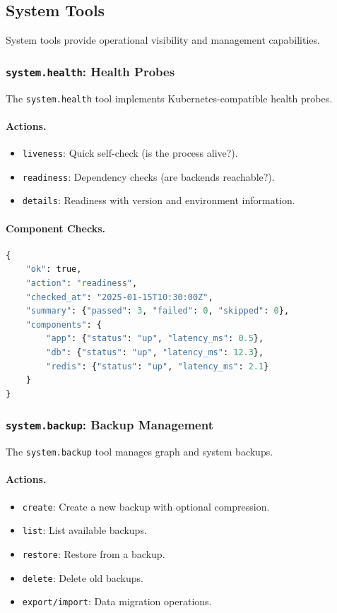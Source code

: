 \subsection{System Tools}
\label{subsec:system-tools}

System tools provide operational visibility and management capabilities.

\subsubsection{\texttt{system.health}: Health Probes}

The \texttt{system.health} tool implements Kubernetes-compatible health probes.

\paragraph{Actions.}
\begin{itemize}
    \item \texttt{liveness}: Quick self-check (is the process alive?).
    \item \texttt{readiness}: Dependency checks (are backends reachable?).
    \item \texttt{details}: Readiness with version and environment information.
\end{itemize}

\paragraph{Component Checks.}
\begin{lstlisting}[language=Python, caption={Health check response with component details}, label={lst:health-response}]
{
    "ok": true,
    "action": "readiness",
    "checked_at": "2025-01-15T10:30:00Z",
    "summary": {"passed": 3, "failed": 0, "skipped": 0},
    "components": {
        "app": {"status": "up", "latency_ms": 0.5},
        "db": {"status": "up", "latency_ms": 12.3},
        "redis": {"status": "up", "latency_ms": 2.1}
    }
}
\end{lstlisting}

\subsubsection{\texttt{system.backup}: Backup Management}

The \texttt{system.backup} tool manages graph and system backups.

\paragraph{Actions.}
\begin{itemize}
    \item \texttt{create}: Create a new backup with optional compression.
    \item \texttt{list}: List available backups.
    \item \texttt{restore}: Restore from a backup.
    \item \texttt{delete}: Delete old backups.
    \item \texttt{export/import}: Data migration operations.
\end{itemize}

